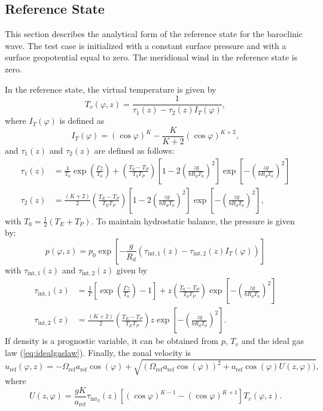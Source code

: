 \documentclass[times,doublespace]{fldauth}
\begin{document}
\subsection{Reference State}

This section describes the analytical form of the reference state for the baroclinic wave.  The test case is initialized with a constant surface pressure and with a surface geopotential equal to zero.  The meridional wind in the reference state is zero.

In the reference state, the virtual temperature is given by
\begin{equation}
T_v(\varphi, z) = \frac{1}{\tau_1(z)-\tau_2(z) I_T(\varphi)},
\label{virtTemp}
\end{equation} where $I_T(\varphi)$ is defined as
\begin{equation}
I_{T}(\varphi) =(\cos \varphi )^K-\frac{K}{K+2}(\cos \varphi )^{K+2},
\end{equation} and $\tau_1(z)$ and $\tau_2(z)$ are defined as follows:
\begin{align}
\tau_1(z) &= \frac{1}{T_0} \exp\left(\frac{\Gamma z}{T_0}\right) + \left( \frac{T_0-T_P}{T_0T_P} \right)\left[1-2\left(\frac{z g}{b R_d T_0}\right)^2\right] \exp\left[-\left(\frac{z g}{b R_d T_0}\right)^2\right] \\
\tau_2(z) &= \frac{(K + 2)}{2} \left( \frac{T_E-T_P}{T_E T_P} \right) \left[1-2\left(\frac{z g}{b R_d T_0}\right)^2\right] \exp\left[-\left(\frac{z g}{b R_d T_0}\right)^2\right],
\end{align} with $T_0 = \tfrac{1}{2} (T_E + T_P)$.  To maintain hydrostatic balance, the pressure is given by:
\begin{equation}
p(\varphi, z) = p_0\exp \left[ -\frac{g}{R_d}(\tau_{\text{int},1}(z) -\tau_{\text{int},2}(z) I_T(\varphi) ) \right]
\end{equation} with $\tau_{\text{int},1}(z)$ and $\tau_{\text{int},2}(z)$ given by
\begin{align}
\tau_{\text{int},1}(z) &=\frac{1}{\Gamma} \left[ \exp\left( \frac{\Gamma z}{T_0} \right)-1 \right] + z \left(\frac{T_0-T_P}{T_0T_P} \right) \exp\left[-\left(\frac{z g}{b R_d T_0}\right)^2\right] \\
\tau_{\text{int},2}(z) &=\frac{(K+2)}{2} \left(\frac{T_E-T_P}{T_E T_P} \right) z \exp\left[-\left(\frac{z g}{b R_d T_0}\right)^2\right].
\end{align}  If density is a prognostic variable, it can be obtained from $p$, $T_v$ and the ideal gas law (\ref{eq:idealgaslaw}).  Finally, the zonal velocity is
\begin{equation}
u_{\text{ref}}(\varphi, z) = -\Omega_{\text{ref}} a_{\text{ref}} \cos(\varphi)+\sqrt{(\Omega_{\text{ref}} a_{\text{ref}} \cos(\varphi))^2+ a_{\text{ref}} \cos(\varphi)U(z,\varphi))},
\end{equation} where
\begin{equation}
U(z, \varphi) = \frac{g K}{a_{\text{ref}}} \tau_{\text{int}_2}(z) \left[ (\cos \varphi)^{K - 1} - (\cos \varphi)^{K + 1} \right] T_v(\varphi, z).
\end{equation} 
\end{document}
